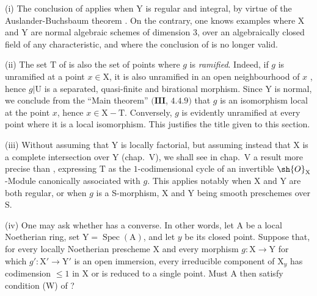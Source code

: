 \begin{remarks}[21.12.14]
\label{IV.21.12.14}
(i)
The conclusion of  applies when $\mathrm{Y}$ is regular and integral, by virtue of the Auslander-Buchsbaum theorem .
On the contrary, one knows examples where $\mathrm{X}$ and $\mathrm{Y}$ are normal algebraic schemes of dimension $3$, over an algebraically closed field of any characteristic, and where the conclusion of  is no longer valid.

(ii)
The set $\mathrm{T}$ of  is also the set of points where $g$ is \emph{ramified}.
Indeed, if $g$ is unramified at a point $x\in\mathrm{X}$, it is also unramified in an open neighbourhood of $x$ , hence $g|\mathrm{U}$ is a separated, quasi-finite and birational morphism.
Since $\mathrm{Y}$ is normal, we conclude from the ``Main theorem'' $(\mathbf{III}$, $4.4.9)$ that $g$ is an isomorphism local at the point $x$, hence $x\in\mathrm{X}-\mathrm{T}$.
Conversely, $g$ is evidently unramified at every point where it is a local isomorphism.
This justifies the title given to this section.

(iii)
Without assuming that $\mathrm{Y}$ is locally factorial, but assuming instead that $\mathrm{X}$ is a complete intersection over $\mathrm{Y}$ (chap.~V), we shall see in chap.~V a result more precise than , expressing $\mathrm{T}$ as the $1$-codimensional cycle of an invertible $\sh{O}_{\mathrm{X}}$-Module canonically associated with $g$.
This applies notably when $\mathrm{X}$ and $\mathrm{Y}$ are both regular, or when $g$ is a S-morphism, $\mathrm{X}$ and $\mathrm{Y}$ being smooth preschemes over $\mathrm{S}$.

(iv) One may ask whether  has a converse.  In other words, let $\mathrm{A}$ be a local Noetherian ring, set $\mathrm{Y}=\operatorname{Spec}(\mathrm{A})$, and let $y$ be its closed point.  Suppose that, for every locally Noetherian prescheme $\mathrm{X}$ and every morphism $g:\mathrm{X}\to\mathrm{Y}$ for which $g':\mathrm{X}'\to\mathrm{Y}'$ is an open immersion, every irreducible component of $\mathrm{X}_y$ has codimension $\leq 1$ in $\mathrm{X}$ or is reduced to a single point.  Must $\mathrm{A}$ then satisfy condition (W) of ?


\end{remarks}
